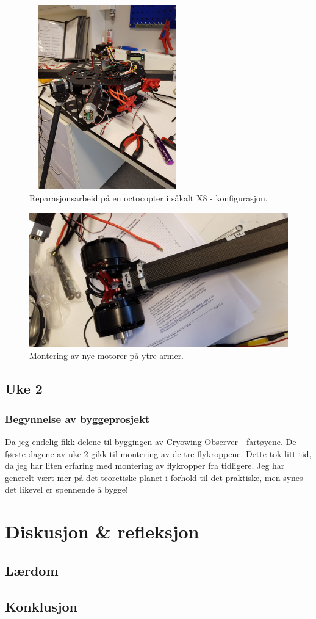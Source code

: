 \documentclass[12pt, a4paper]{report}
\begin{document}
\begin{figure}[h]
	\centering
	\includegraphics[height = 8cm, width = 0.6\textwidth]{octocopt_x8.jpg}
	\caption{Reparasjonsarbeid på en octocopter i såkalt X8 - konfigurasjon.}
\end{figure}
\begin{figure}[h]
	\centering
	\includegraphics[scale=.2]{octarm_x8.jpg}
	\caption{Montering av nye motorer på ytre armer.}
\end{figure}

\subsection{Uke 2}
\subsubsection{Begynnelse av byggeprosjekt}
Da jeg endelig fikk delene til byggingen av Cryowing Observer - fartøyene. De første dagene av uke 2 gikk til montering av de tre flykroppene. Dette tok litt tid, da jeg har liten erfaring med montering av flykropper fra tidligere. Jeg har generelt vært mer på det teoretiske planet i forhold til det praktiske, men synes det likevel er spennende å bygge! 

\section{Diskusjon \& refleksjon}
\subsection{Lærdom}


\subsection{Konklusjon}
\end{document}

